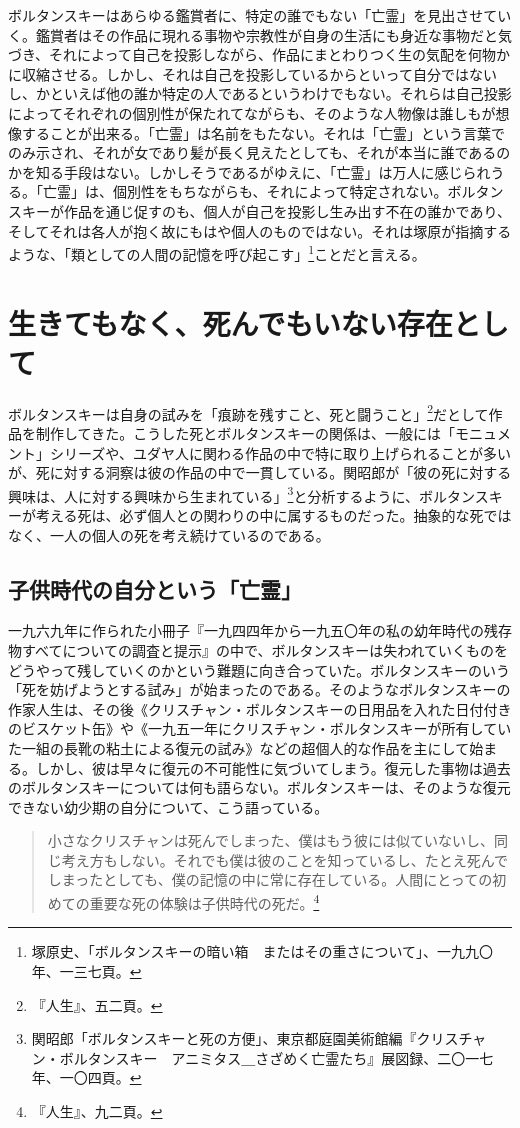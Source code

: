 \documentclass[b5j,twoside,twocolumn]{utarticle}
\begin{document}
ボルタンスキーはあらゆる鑑賞者に、特定の誰でもない「亡霊」を見出させていく。鑑賞者はその作品に現れる事物や宗教性が自身の生活にも身近な事物だと気づき、それによって自己を投影しながら、作品にまとわりつく生の気配を何物かに収縮させる。しかし、それは自己を投影しているからといって自分ではないし、かといえば他の誰か特定の人であるというわけでもない。それらは自己投影によってそれぞれの個別性が保たれてながらも、そのような人物像は誰しもが想像することが出来る。「亡霊」は名前をもたない。それは「亡霊」という言葉でのみ示され、それが女であり髪が長く見えたとしても、それが本当に誰であるのかを知る手段はない。しかしそうであるがゆえに、「亡霊」は万人に感じられうる。「亡霊」は、個別性をもちながらも、それによって特定されない。ボルタンスキーが作品を通じ促すのも、個人が自己を投影し生み出す不在の誰かであり、そしてそれは各人が抱く故にもはや個人のものではない。それは塚原が指摘するような、「類としての人間の記憶を呼び起こす」\footnote{塚原史、「ボルタンスキーの暗い箱　またはその重さについて」、一九九〇年、一三七頁。}ことだと言える。

\section{生きてもなく、死んでもいない存在として}
ボルタンスキーは自身の試みを「痕跡を残すこと、死と闘うこと」\footnote{『人生』、五二頁。}だとして作品を制作してきた。こうした死とボルタンスキーの関係は、一般には「モニュメント」シリーズや、ユダヤ人に関わる作品の中で特に取り上げられることが多いが、死に対する洞察は彼の作品の中で一貫している。関昭郎が「彼の死に対する興味は、人に対する興味から生まれている」\footnote{関昭郎「ボルタンスキーと死の方便」、東京都庭園美術館編『クリスチャン・ボルタンスキー　アニミタス＿さざめく亡霊たち』展図録、二〇一七年、一〇四頁。}と分析するように、ボルタンスキーが考える死は、必ず個人との関わりの中に属するものだった。抽象的な死ではなく、一人の個人の死を考え続けているのである。
\subsection{子供時代の自分という「亡霊」}
一九六九年に作られた小冊子『一九四四年から一九五〇年の私の幼年時代の残存物すべてについての調査と提示』の中で、ボルタンスキーは失われていくものをどうやって残していくのかという難題に向き合っていた。ボルタンスキーのいう「死を妨げようとする試み」が始まったのである。そのようなボルタンスキーの作家人生は、その後《クリスチャン・ボルタンスキーの日用品を入れた日付付きのビスケット缶》や《一九五一年にクリスチャン・ボルタンスキーが所有していた一組の長靴の粘土による復元の試み》などの超個人的な作品を主にして始まる。しかし、彼は早々に復元の不可能性に気づいてしまう。復元した事物は過去のボルタンスキーについては何も語らない。ボルタンスキーは、そのような復元できない幼少期の自分について、こう語っている。
\begin{quote}
小さなクリスチャンは死んでしまった、僕はもう彼には似ていないし、同じ考え方もしない。それでも僕は彼のことを知っているし、たとえ死んでしまったとしても、僕の記憶の中に常に存在している。人間にとっての初めての重要な死の体験は子供時代の死だ。\footnote{『人生』、九二頁。}
\end{quote}
\end{document}
